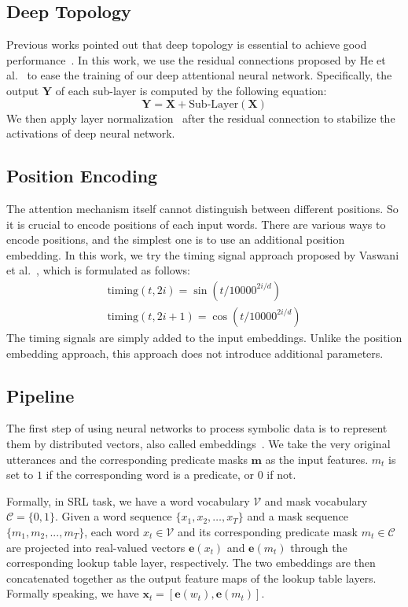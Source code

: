 \documentclass[letterpaper]{article} \usepackage{aaai18}  \usepackage{times}  \usepackage{helvet}  \usepackage{courier}  \usepackage{url}  \usepackage{graphicx}  \frenchspacing  \setlength{\pdfpagewidth}{8.5in}  \setlength{\pdfpageheight}{11in}  \usepackage{latexsym}
\begin{document}
\subsection{Deep Topology}
Previous works pointed out that deep topology is essential to achieve good performance~\cite{zhou2015end,he2017deep}. In this work, we use the residual connections proposed by He et al.~ to ease the training of our deep attentional neural network. Specifically, the output $\mathbf{Y}$ of each sub-layer is computed by the following equation:
\begin{equation}
\mathbf{Y} = \mathbf{X} + \textrm{Sub-Layer}(\mathbf{X})
\end{equation}
We then apply layer normalization~\cite{ba2016layer} after the residual connection to stabilize the activations of deep neural network.

\subsection{Position Encoding}
The attention mechanism itself cannot distinguish between different positions. So it is crucial to encode positions of each input words. There are various ways to encode positions, and the simplest one is to use an additional position embedding. In this work, we try the timing signal approach proposed by Vaswani et al.~, which is formulated as follows:
\begin{align}
\textrm{timing}(t, 2i) = \sin(t / 10000^{2i / d}) \\
\textrm{timing}(t, 2i + 1) = \cos(t / 10000^{2i / d})
\end{align}
The timing signals are simply added to the input embeddings. Unlike the position embedding approach, this approach does not introduce additional parameters.

\subsection{Pipeline}
The first step of using neural networks to process symbolic data is to represent them by distributed vectors, also called embeddings~\cite{Bengio-Janvin-JMLR2003}. We take the very original utterances and the corresponding predicate masks $\mathbf{m}$ as the input features. $m_t$ is set to $1$ if the corresponding word is a predicate, or $0$ if not.

Formally, in SRL task, we have a word vocabulary $\mathcal{V}$ and mask vocabulary $\mathcal{C}=\{0,1\}$. Given a word sequence $\{x_1, x_2, \ldots, x_T\}$ and a mask sequence $\{m_1, m_2, ..., m_T\}$, each word $x_t \in \mathcal{V}$ and its corresponding predicate mask $m_t \in \mathcal{C}$ are projected into real-valued vectors $\mathbf{e}(x_t)$ and $\mathbf{e}(m_t)$ through the corresponding lookup table layer, respectively. The two embeddings are then concatenated together as the output feature maps of the lookup table layers. Formally speaking, we have $\mathbf{x}_t = \left[\mathbf{e}(w_t),\mathbf{e}(m_t)\right]$.
\end{document}
